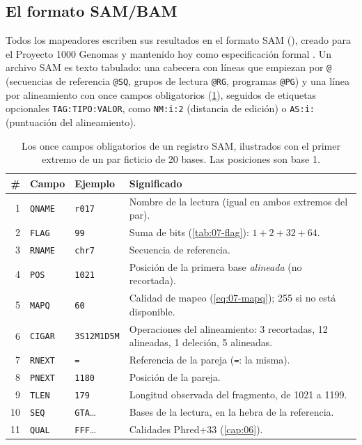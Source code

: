 \subsection{El formato SAM/BAM}

Todos los mapeadores escriben sus resultados en el formato SAM (), creado para el Proyecto 1000 Genomas \parencite{c07-li2009sam} y mantenido hoy como especificación formal \parencite{c07-samspec}. Un archivo SAM es texto tabulado: una cabecera con líneas que empiezan por \texttt{@} (secuencias de referencia \texttt{@SQ}, grupos de lectura \texttt{@RG}, programas \texttt{@PG}) y una línea por alineamiento con once campos obligatorios (\cref{tab:07-sam}), seguidos de etiquetas opcionales \texttt{TAG:TIPO:VALOR}, como \texttt{NM:i:2} (distancia de edición) o \texttt{AS:i:} (puntuación del alineamiento).

\begin{table}[tbp]
\centering
\small
\caption[Campos obligatorios de un registro SAM]{Los once campos obligatorios de un registro SAM, ilustrados con el primer extremo de un par ficticio de 20 bases. Las posiciones son base 1.}
\label{tab:07-sam}
\begin{tabularx}{\linewidth}{@{}rllX@{}}
\toprule
\# & Campo & Ejemplo & Significado\\
\midrule
1 & \texttt{QNAME} & \texttt{r017} & Nombre de la lectura (igual en ambos extremos del par).\\
2 & \texttt{FLAG} & \texttt{99} & Suma de bits (\cref{tab:07-flag}): $1+2+32+64$.\\
3 & \texttt{RNAME} & \texttt{chr7} & Secuencia de referencia.\\
4 & \texttt{POS} & \texttt{1021} & Posición de la primera base \emph{alineada} (no recortada).\\
5 & \texttt{MAPQ} & \texttt{60} & Calidad de mapeo (\cref{eq:07-mapq}); 255 si no está disponible.\\
6 & \texttt{CIGAR} & \texttt{3S12M1D5M} & Operaciones del alineamiento: 3 recortadas, 12 alineadas, 1 deleción, 5 alineadas.\\
7 & \texttt{RNEXT} & \texttt{=} & Referencia de la pareja (\texttt{=}: la misma).\\
8 & \texttt{PNEXT} & \texttt{1180} & Posición de la pareja.\\
9 & \texttt{TLEN} & \texttt{179} & Longitud observada del fragmento, de 1021 a 1199.\\
10 & \texttt{SEQ} & \texttt{GTA}\ldots & Bases de la lectura, en la hebra de la referencia.\\
11 & \texttt{QUAL} & \texttt{FFF}\ldots & Calidades Phred+33 (\cref{cap:06}).\\
\bottomrule
\end{tabularx}
\end{table}

